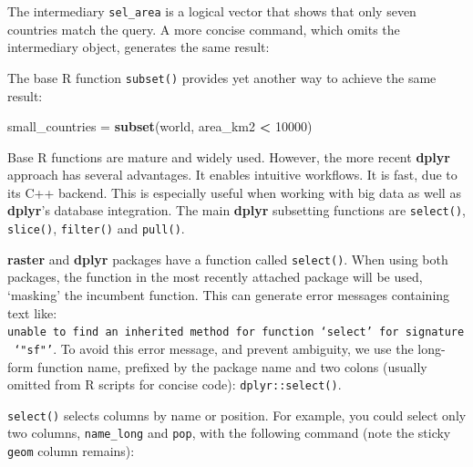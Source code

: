 \documentclass[]{krantz}
\makeatletter
\newenvironment{Shaded}{\begin{snugshade}}{\end{snugshade}}
\newcommand{\DecValTok}[1]{\textcolor[rgb]{0.06,0.06,0.06}{#1}}
\newcommand{\KeywordTok}[1]{\textcolor[rgb]{0.27,0.27,0.27}{\textbf{#1}}}
\newcommand{\NormalTok}[1]{#1}
\newcommand{\OperatorTok}[1]{\textcolor[rgb]{0.43,0.43,0.43}{\textbf{#1}}}
\newcommand{\StringTok}[1]{\textcolor[rgb]{0.5,0.5,0.5}{#1}}
\newenvironment{kframe}{%
\medskip{}
\setlength{\fboxsep}{.8em}
 \def\at@end@of@kframe{}%
 \ifinner\ifhmode%
  \def\at@end@of@kframe{\end{minipage}}%
  \begin{minipage}{\columnwidth}%
 \fi\fi%
 \def\FrameCommand##1{\hskip\@totalleftmargin \hskip-\fboxsep
 \colorbox{shadecolor}{##1}\hskip-\fboxsep
     \hskip-\linewidth \hskip-\@totalleftmargin \hskip\columnwidth}%
 \MakeFramed {\advance\hsize-\width
   \@totalleftmargin\z@ \linewidth\hsize
   \@setminipage}}%
 {\par\unskip\endMakeFramed%
 \at@end@of@kframe}
\newenvironment{rmdblock}[1]
  {
  \begin{itemize}
  \renewcommand{\labelitemi}{
    \raisebox{-.7\height}[0pt][0pt]{
      {\setkeys{Gin}{width=3em,keepaspectratio}\texttt{[image: images/\#1]}}
    }
  }
  \setlength{\fboxsep}{1em}
  \begin{kframe}
  \item
  }
  {
  \end{kframe}
  \end{itemize}
  }
\newenvironment{rmdnote}
  {\begin{rmdblock}{note}}
  {\end{rmdblock}}
\makeatother
\begin{document}
The intermediary \texttt{sel\_area} is a logical vector that shows that only seven countries match the query.
A more concise command, which omits the intermediary object, generates the same result:

\begin{Shaded}
\end{Shaded}

The base R function \texttt{subset()} provides yet another way to achieve the same result:

\begin{Shaded}
\begin{Highlighting}[]
\NormalTok{small_countries =}\StringTok{ }\KeywordTok{subset}\NormalTok{(world, area_km2 }\OperatorTok{<}\StringTok{ }\DecValTok{10000}\NormalTok{)}
\end{Highlighting}
\end{Shaded}

Base R functions are mature and widely used.
However, the more recent \textbf{dplyr} approach has several advantages.
It enables intuitive workflows.
It is fast, due to its C++ backend.
This is especially useful when working with big data as well as \textbf{dplyr}'s database integration.
The main \textbf{dplyr} subsetting functions are \texttt{select()}, \texttt{slice()}, \texttt{filter()} and \texttt{pull()}.

\begin{rmdnote}
\textbf{raster} and \textbf{dplyr} packages have a function called
\texttt{select()}. When using both packages, the function in the most
recently attached package will be used, `masking' the incumbent
function. This can generate error messages containing text like:
\texttt{unable\ to\ find\ an\ inherited\ method\ for\ function\ ‘select’\ for\ signature\ ‘"sf"’}.
To avoid this error message, and prevent ambiguity, we use the long-form
function name, prefixed by the package name and two colons (usually
omitted from R scripts for concise code): \texttt{dplyr::select()}.
\end{rmdnote}

\texttt{select()} selects columns by name or position.
For example, you could select only two columns, \texttt{name\_long} and \texttt{pop}, with the following command (note the sticky \texttt{geom} column remains):
\end{document}
